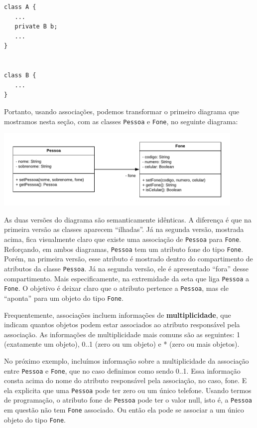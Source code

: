 \documentclass[
  11pt,
  twoside]{book}
\newcommand{\passthrough}[1]{#1}
\begin{document}
\begin{lstlisting}
class A {
   ...
   private B b;
   ...
}


class B {
   ...
}
\end{lstlisting}

Portanto, usando associações, podemos transformar o primeiro diagrama
que mostramos nesta seção, com as classes
\passthrough{\lstinline!Pessoa!} e \passthrough{\lstinline!Fone!}, no
seguinte diagrama:

\includegraphics[width=0.9\textwidth,height=\textheight]{figs/cap4/class3.pdf}

As duas versões do diagrama são semanticamente idênticas. A diferença é
que na primeira versão as classes aparecem ``ilhadas''. Já na segunda
versão, mostrada acima, fica visualmente claro que existe uma associação
de \passthrough{\lstinline!Pessoa!} para \passthrough{\lstinline!Fone!}.
Reforçando, em ambos diagramas, \passthrough{\lstinline!Pessoa!} tem um
atributo fone do tipo \passthrough{\lstinline!Fone!}. Porém, na primeira
versão, esse atributo é mostrado dentro do compartimento de atributos da
classe \passthrough{\lstinline!Pessoa!}. Já na segunda versão, ele é
apresentado ``fora'' desse compartimento. Mais especificamente, na
extremidade da seta que liga \passthrough{\lstinline!Pessoa!} a
\passthrough{\lstinline!Fone!}. O objetivo é deixar claro que o atributo
pertence a \passthrough{\lstinline!Pessoa!}, mas ele ``aponta'' para um
objeto do tipo \passthrough{\lstinline!Fone!}.

 Frequentemente, associações incluem
informações de \textbf{multiplicidade}, que indicam quantos objetos
podem estar associados ao atributo responsável pela associação. As
informações de multiplicidade mais comuns são as seguintes: 1
(exatamente um objeto), 0..1 (zero ou um objeto) e * (zero ou mais
objetos).

No próximo exemplo, incluímos informação sobre a multiplicidade da
associação entre \passthrough{\lstinline!Pessoa!} e
\passthrough{\lstinline!Fone!}, que no caso definimos como sendo 0..1.
Essa informação consta acima do nome do atributo responsável pela
associação, no caso, fone. E ela explicita que uma
\passthrough{\lstinline!Pessoa!} pode ter zero ou um único telefone.
Usando termos de programação, o atributo fone de
\passthrough{\lstinline!Pessoa!} pode ter o valor null, isto é, a
\passthrough{\lstinline!Pessoa!} em questão não tem
\passthrough{\lstinline!Fone!} associado. Ou então ela pode se associar
a um único objeto do tipo \passthrough{\lstinline!Fone!}.
\end{document}
